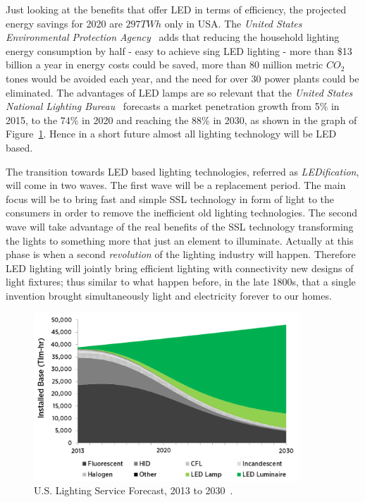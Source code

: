 Just looking at the benefits that offer LED in terms of efficiency, the projected energy savings for 2020 are $297TWh$ only in USA. The \emph{United States Environmental Protection Agency}~\cite{14USDoE} adds that reducing the household lighting energy consumption by half - easy to achieve sing LED lighting -  more than \$13 billion a year in energy costs could be saved, more than 80 million metric $CO_2$ tones would be avoided each year, and the need for over 30 power plants could be eliminated. The advantages of LED lamps are so relevant that the \emph{United States National Lighting Bureau}~\cite{14USDoE} forecasts a market penetration growth from 5\% in 2015, to the 74\% in 2020 and reaching the 88\% in 2030, as shown in the graph of Figure~\ref{fig:lighting_forecast}. Hence in a short future almost all lighting technology will be LED based.

The transition towards LED based lighting technologies, referred as \emph{LEDification}, will come in two waves. The first wave will be a replacement period. The main focus will be to bring fast and simple SSL technology in form of light to the consumers in order to remove the inefficient old lighting technologies. The second wave will take advantage of the real benefits of the SSL technology transforming the lights to something more that just an element to illuminate. Actually at this phase is when a second \emph{revolution} of the lighting industry will happen. Therefore LED lighting will jointly bring efficient lighting with connectivity new designs of light fixtures; thus similar to what happen before, in the late 1800s, that a single invention brought simultaneously light and electricity forever to our homes.

\begin{figure}[!h]
\centering
\includegraphics[width=10cm]{./0_intro/img/lighting_forecast.png}
\caption{U.S. Lighting Service Forecast, 2013 to 2030~\cite{14USDoE}.  }
\label{fig:lighting_forecast}
\end{figure}


